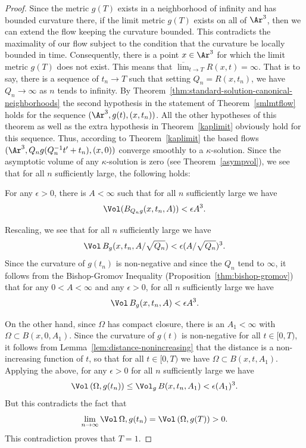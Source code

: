 \begin{proof}
Since the metric $g(T)$ exists in a neighborhood of infinity and has
bounded curvature there, if the limit metric $g(T)$ exists on all of
$\Ar^3$, then we can extend the flow keeping the curvature bounded.
This contradicts the maximality of our flow subject to the condition
that the curvature be locally bounded in time. Consequently, there
is a point $x\in \Ar^3$ for which the limit metric $g(T)$ does not
exist. This means that $\overline\lim_{t\rightarrow
T}R(x,t)=\infty$. That is to say,  there is a sequence of
$t_n\rightarrow T$ such that setting $Q_n=R(x,t_n)$, we have
$Q_n\rightarrow \infty$ as $n$ tends to infinity. By
Theorem~\ref{thm:standard-solution-canonical-neighborhoods} the second hypothesis in the statement of
Theorem~\ref{smlmtflow} holds for the sequence
$(\Ar^3,g(t),(x,t_n))$. All the other hypotheses of this theorem as
well as the extra hypothesis in Theorem~\ref{kaplimit} obviously
hold for this sequence. Thus, according to Theorem~\ref{kaplimit}
the based flows $(\Ar^3,Q_ng(Q_n^{-1}t'+t_n),(x,0))$ converge
smoothly to a $\kappa$-solution. Since the asymptotic volume of any
$\kappa$-solution is zero (see Theorem~\ref{asympvol}), we see that
for all $n$ sufficiently large, the following holds:

\begin{claim}
\label{claim:kappa-solution-volume-ratio-small}
For any $\epsilon>0$, there is $A<\infty$ such that for all $n$
sufficiently large we have
$$\Vol(B_{Q_ng}(x,t_n,A))<\epsilon A^3.$$
\end{claim}


Rescaling, we see that for all $n$ sufficiently large we have
$$\Vol\,B_g(x,t_n,A/\sqrt{Q_n})< \epsilon(A/\sqrt{Q_n})^3.$$
Since the curvature of $g(t_n)$ is non-negative and since the $Q_n$
tend to $\infty$, it follows from the Bishop-Gromov Inequality
(Proposition~\ref{thm:bishop-gromov}) that for any $0<A<\infty$ and any
$\epsilon>0$, for all $n$ sufficiently large we have
$$\Vol\,B_g(x,t_n,A)<\epsilon A^3.$$

On the other hand, since $\Omega$ has compact closure, there is an
$A_1<\infty$ with $\Omega\subset B(x,0,A_1)$. Since the curvature of
$g(t)$ is non-negative for all $t\in [0,T)$, it follows from
Lemma~\ref{lem:distance-nonincreasing} that the distance is a non-increasing
function of $t$, so that for all $t\in [0,T)$ we have $\Omega\subset
B(x,t,A_1)$. Applying the above, for any $\epsilon>0$ for all $n$
sufficiently large we have
$$\Vol\,(\Omega,g(t_n))\le \Vol_g\,B(x,t_n,A_1)<\epsilon
(A_1)^3.$$ But this contradicts the fact that
$$\lim_{n\rightarrow
\infty}\Vol\,\Omega,g(t_n)=\Vol\,(\Omega,g(T))>0.$$ This
contradiction proves that $T=1$.
\end{proof}


